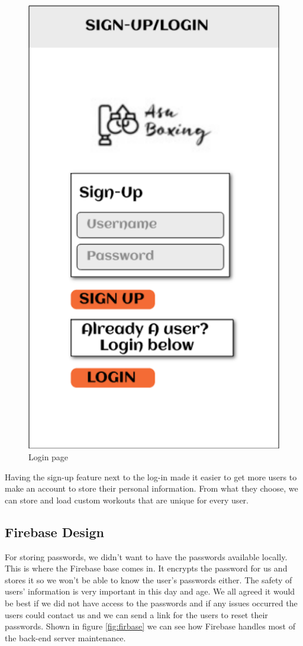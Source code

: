 \documentclass[a4paper,12pt]{report}
\begin{document}
\begin{figure}[h]
\begin{center}
\includegraphics[scale=.3]{images/loginPageBorder.png}
\end{center}
\caption{Login page}
\label{fig:LazyLoading}
\end{figure}

Having the sign-up feature next to the log-in made it easier to get more users to make an account to store their personal information. From what they choose, we can store and load custom workouts that are unique for every user. 
\subsection{Firebase Design}
For storing passwords, we didn't want to have the passwords available locally. This is where the Firebase base comes in. It encrypts the password for us and stores it so we won't be able to know the user's passwords either. The safety of users' information is very important in this day and age. We all agreed it would be best if we did not have access to the passwords and if any issues occurred the users could contact us and we can send a link for the users to reset their passwords. Shown in figure \ref{fig:firbase} we can see how Firebase handles most of the back-end server maintenance.
\end{document}
